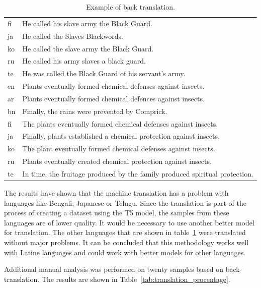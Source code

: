 \begin{table}[H]
\begin{tabular}{l|p{11cm}}
        fi & He called his slave army the Black Guard. \\
        ja & He called the Slaves Blackwords. \\
        ko & He called the slave army the Black Guard. \\
        ru & He called his army slaves a black guard. \\
        te & He was called the Black Guard of his servant’s army. \\
        \hline
        \hline
        en & Plants eventually formed chemical defenses against insects. \\
        \hline
        ar & Plants eventually formed chemical defences against insects. \\
        bn & Finally, the rains were prevented by Comprick. \\
        fi & The plants eventually formed chemical defenses against insects. \\
        ja & Finally, plants established a chemical protection against insects. \\
        ko & The plant eventually formed chemical defenses against insects. \\
        ru & Plants eventually created chemical protection against insects. \\
        te & In time, the fruitage produced by the family produced spiritual protection. \\
        \hline
    \end{tabular}
    \caption{Example of back translation.}
    \label{tab:all_translation}
\end{table}

The results have shown that the machine translation has a problem with languages like Bengali, Japanese or Telugu. Since the translation is part of the process of creating a dataset using the T5 model, the samples from these languages are of lower quality. It would be necessary to use another better model for translation. The other languages that are shown in table~\ref{tab:all_translation} were translated without major problems. It can be concluded that this methodology works well with Latine languages and could work with better models for other languages.

Additional manual analysis was performed on twenty samples based on back-translation. The results are shown in Table~\ref{tab:translation_procentage}.


